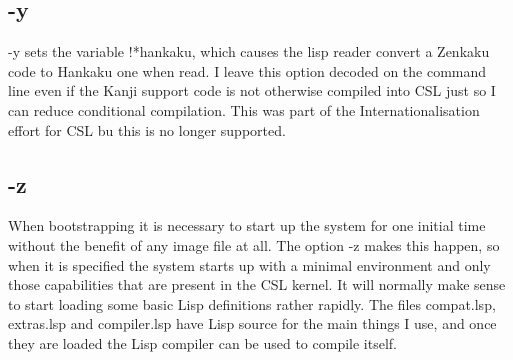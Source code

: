 \documentclass[a4paper,11pt]{article}
\begin{document}
\subsection{\ttfamily -y}
{\ttfamily -y } sets the variable {\ttfamily !*hankaku}, which causes the
lisp reader convert a Zenkaku code to Hankaku one when read. I leave this
option decoded on the command line even if the Kanji support code is not
otherwise compiled into CSL just so I can reduce conditional compilation.
This was part of the Internationalisation effort for CSL bu this is no longer
supported. 
\subsection{\ttfamily -z}
When bootstrapping it is necessary to start up the system for one initial time
without the benefit of any image file at all. The option {\ttfamily -z} makes
this happen, so when it is specified the system starts up with a minimal
environment and only those capabilities that are present in the CSL
kernel. It will normally make sense to start loading some basic Lisp
definitions rather rapidly. The files {\ttfamily compat.lsp},
{\ttfamily extras.lsp} and {\ttfamily compiler.lsp} have Lisp source for the
main things I use, and once they are loaded the Lisp compiler can be used
to compile itself.
\end{document}
